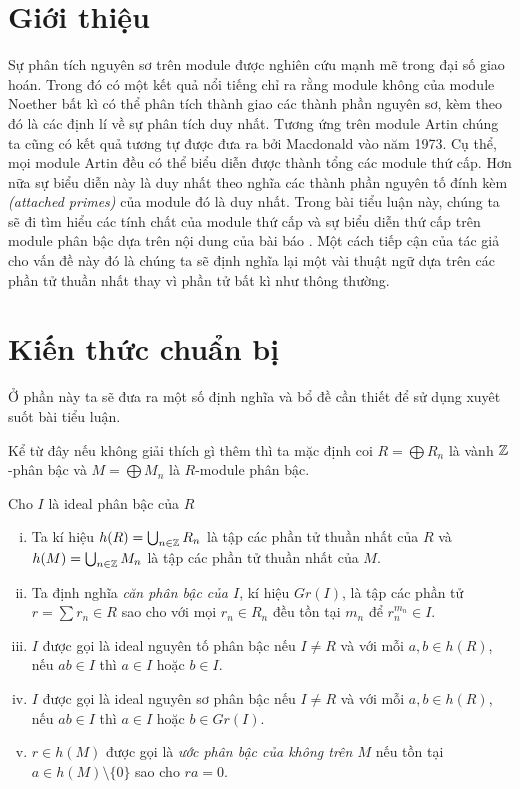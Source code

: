 




\section{Giới thiệu}
Sự phân tích nguyên sơ trên module được nghiên cứu mạnh mẽ trong đại số giao hoán. Trong đó có một kết quả nổi tiếng chỉ ra rằng module không của module Noether bất kì có thể phân tích thành giao các thành phần nguyên sơ, kèm theo đó là các định lí về sự phân tích duy nhất. Tương ứng trên module Artin chúng ta cũng có kết quả tương tự được đưa ra bởi Macdonald vào năm 1973. Cụ thể, mọi module Artin đều có thể biểu diễn được thành tổng các module thứ cấp. Hơn nữa sự biểu diễn này là duy nhất theo nghĩa các thành phần nguyên tố đính kèm \textit{(attached primes)} của module đó là duy nhất. Trong bài tiểu luận này, chúng ta sẽ đi tìm hiểu các tính chất của module thứ cấp và sự biểu diễn thứ cấp trên module phân bậc dựa trên nội dung của bài báo \cite{AFGraded}. Một cách tiếp cận của tác giả cho vấn đề này đó là chúng ta sẽ định nghĩa lại một vài thuật ngữ dựa trên các phần tử thuần nhất thay vì phần tử bất kì như thông thường.

\section{Kiến thức chuẩn bị}
Ở phần này ta sẽ đưa ra một số định nghĩa và bổ đề cần thiết để sử dụng xuyêt suốt bài tiểu luận.

Kể từ đây nếu không giải thích gì thêm thì ta mặc định coi $R = \bigoplus R_n$ là vành $\mathbb Z$-phân bậc và $M = \bigoplus M_n$ là $R$-module phân bậc.

\begin{define} Cho $I$ là ideal phân bậc của $R$
    \begin{enumerate}[(i)]
        \item Ta kí hiệu $h(R) = \bigcup_{n \in \mathbb Z}R_n$ là tập các phần tử thuần nhất của $R$ và $h(M) = \bigcup_{n \in \mathbb Z}M_n$ là tập các phần tử thuần nhất của $M$.
        \item Ta định nghĩa \textit{căn phân bậc của $I$}, kí hiệu $Gr(I)$, là tập các phần tử $r = \sum r_n \in R$ sao cho với mọi $r_n \in R_n$ đều tồn tại $m_n$ để $r_n^{m_n} \in I$.
        \item $I$ được gọi là ideal nguyên tố phân bậc nếu $I \neq R$ và với mỗi $a,b \in h(R)$, nếu $ab \in I$ thì $a \in I$ hoặc $b \in I$.\item $I$ được gọi là ideal nguyên sơ phân bậc nếu $I \neq R$ và với mỗi $a,b \in h(R)$, nếu $ab \in I$ thì $a \in I$ hoặc $b \in Gr(I)$.
        \item $r \in h(M)$ được gọi là \textit{ước phân bậc của không trên $M$} nếu tồn tại $a \in h(M) \setminus \{0\}$ sao cho $ra = 0$.
    \end{enumerate}
\end{define}

